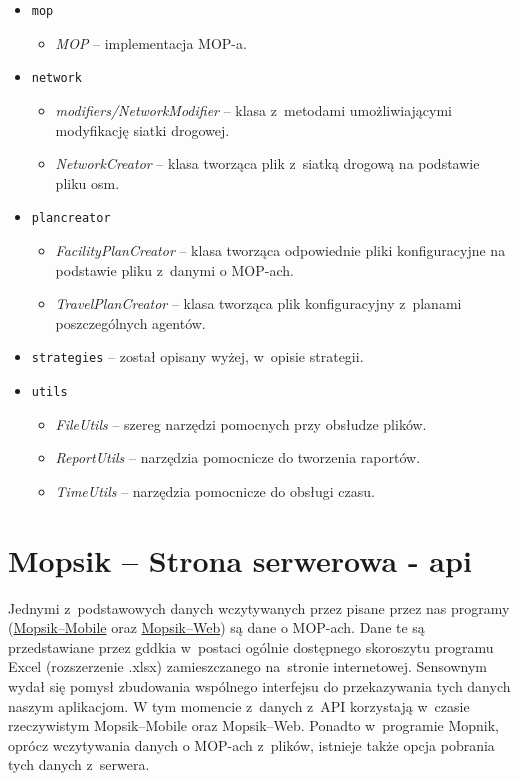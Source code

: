 \begin{itemize}
\begin{itemize}
        \end{itemize}
    \item \texttt{mop}
        \begin{itemize}
            \item \textit{MOP} -- implementacja MOP-a.
        \end{itemize}
    \item \texttt{network}
        \begin{itemize}
            \item \textit{modifiers/NetworkModifier} -- klasa z~metodami umożliwiającymi modyfikację siatki drogowej.
            \item \textit{NetworkCreator} -- klasa tworząca plik z~siatką drogową na podstawie pliku osm.
        \end{itemize}
    \item \texttt{plancreator}
        \begin{itemize}
            \item \textit{FacilityPlanCreator} -- klasa tworząca odpowiednie pliki konfiguracyjne na podstawie pliku z~danymi o MOP-ach.
            \item \textit{TravelPlanCreator} -- klasa tworząca plik konfiguracyjny z~planami poszczególnych agentów.
        \end{itemize}
    \item \texttt{strategies} -- został opisany wyżej, w~opisie strategii.
    \item \texttt{utils}
        \begin{itemize}
            \item \textit{FileUtils} -- szereg narzędzi pomocnych przy obsłudze plików.
            \item \textit{ReportUtils} -- narzędzia pomocnicze do tworzenia raportów.
            \item \textit{TimeUtils} -- narzędzia pomocnicze do obsługi czasu.
        \end{itemize}        
    
\end{itemize}


\chapter{Mopsik -- Strona serwerowa - \acrshort{api}}
\label{mopsik_api}

Jednymi z~podstawowych danych wczytywanych przez pisane przez nas programy (\hyperref[mopsik_mobile]{Mopsik--Mobile} oraz \hyperref[mopsik_web]{Mopsik--Web}) są dane o MOP-ach. Dane te są przedstawiane przez \acrshort{gddkia} w~postaci ogólnie dostępnego skoroszytu programu Excel (rozszerzenie .xlsx) zamieszczanego na~stronie internetowej\cite{mop-gddkia}.
Sensownym wydał się pomysł zbudowania wspólnego interfejsu do przekazywania tych danych naszym aplikacjom. W tym momencie z~danych z~API korzystają w~czasie rzeczywistym Mopsik--Mobile oraz Mopsik--Web. Ponadto w~programie Mopnik, oprócz wczytywania danych o MOP-ach z~plików, istnieje także opcja pobrania tych danych z~serwera.

